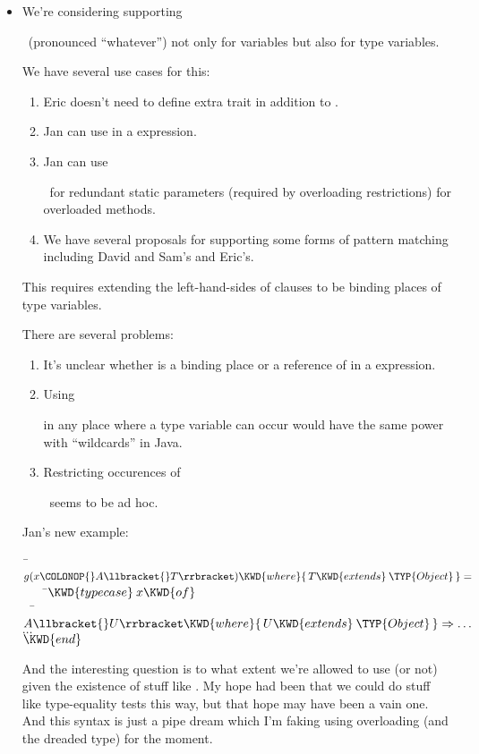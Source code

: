 \begin{itemize}
\item \ignore

We're considering supporting \ignore\ (pronounced ``whatever'') not only for
variables but also for type variables.

We have several use cases for this:
 \begin{enumerate}
 \item Eric doesn't need to define extra trait  in addition to
        .
 \item Jan can use  in a
      expression.
 \item Jan can use \ignore\ for redundant static parameters (required by
     overloading restrictions) for overloaded methods.
 \item We have several proposals for supporting some forms of pattern
        matching including David and Sam's and Eric's.
 \end{enumerate}

   This requires extending the left-hand-sides of  clauses to
   be binding places of type variables.

   There are several problems:
 \begin{enumerate}
     \item It's unclear whether
      is a binding place or
     a     reference        of  in a  expression.
     \item Using \ignore in any place where a type variable can occur would
        have
        the same power with ``wildcards'' in Java.
     \item Restricting occurences of \ignore\ seems to be ad hoc.
 \end{enumerate}

Jan's new example:

\begin{Fortress}
{\tt~}\pushtabs\=\+\( g(x\COLONOP{}A\llbracket{}T\rrbracket) \KWD{where} \{\,T \KWD{extends}\:\TYP{Object}\,\} =\)\\
{\tt~~~~}\pushtabs\=\+\(     \KWD{typecase}\:x \KWD{of}\)\\
{\tt~~}\pushtabs\=\+\(       A\llbracket{}U\rrbracket \KWD{where} \{\,U \KWD{extends}\:\TYP{Object}\,\} \Rightarrow \ldots\)\\
\(       \ldots\)\-\\\poptabs
\(     \KWD{end}\)\-\-\\\poptabs\poptabs
\end{Fortress}
And the interesting question is to what extent we're allowed to use 
(or not) given the existence of stuff like .
My hope had been that we could do stuff like type-equality tests this way,
but that hope may have been a vain one.  And this syntax is just a pipe dream
which I'm faking using overloading (and the dreaded  type)
for the moment.

\end{itemize}

